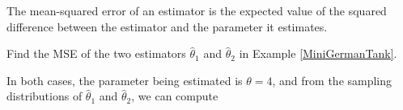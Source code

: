 \begin{defn} The mean-squared error of an estimator is the expected value of the squared difference between the estimator and the parameter it estimates.
\end{defn}
\par
\noindent
\begin{examp}Find the MSE of the two estimators $\widehat{\theta}_1$ and $\widehat{\theta}_2$ in Example \ref{MiniGermanTank}.
\par
\noindent In both cases, the parameter being estimated is $\theta = 4$, and from the sampling distributions of $\widehat{\theta}_1$ and $\widehat{\theta}_2$, we can compute 
\end{examp}
\par

